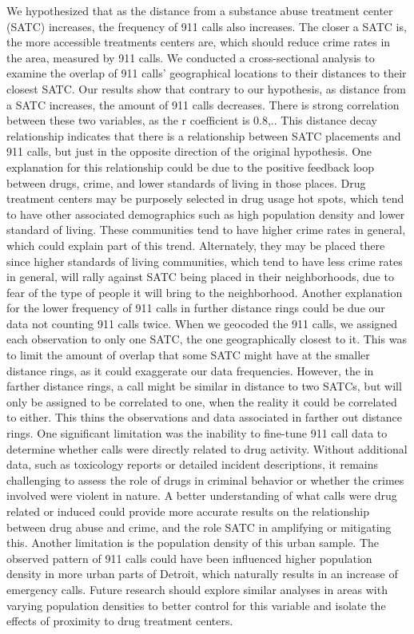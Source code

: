 \documentclass[12pt]{article}
\begin{document}
    We hypothesized that as the distance from a substance abuse treatment center (SATC) increases, the frequency of 911 calls also increases. The closer a SATC is, the more accessible treatments centers are, which should reduce crime rates in the area, measured by 911 calls. We conducted a cross-sectional analysis to examine the overlap of 911 calls' geographical locations to their distances to their closest SATC. Our results show that contrary to our hypothesis, as distance from a SATC increases, the amount of 911 calls decreases. There is strong correlation between these two variables, as the r coefficient is 0.8,.. This distance decay relationship indicates that there is a relationship between SATC placements and 911 calls, but just in the opposite direction of the original hypothesis. 
    One explanation for this relationship could be due to the positive feedback loop between drugs, crime, and lower standards of living in those places. Drug treatment centers may be purposely selected in drug usage hot spots, which tend to have other associated demographics such as high population density and lower standard of living. These communities tend to have higher crime rates in general, which could explain part of this trend. Alternately, they may be placed there since higher standards of living communities, which tend to have less crime rates in general, will rally against SATC being placed in their neighborhoods, due to fear of the type of people it will bring to the neighborhood. 
    Another explanation for the lower frequency of 911 calls in further distance rings could be due our data not counting 911 calls twice. When we geocoded the 911 calls, we assigned each observation to only one SATC, the one geographically closest to it. This was to limit the amount of overlap that some SATC might have at the smaller distance rings, as it could exaggerate our data frequencies. However, the in farther distance rings, a call might be similar in distance to two SATCs, but will only be assigned to be correlated to one, when the reality it could be correlated to either. This thins the observations and data associated in farther out distance rings. 
    One significant limitation was the inability to fine-tune 911 call data to determine whether calls were directly related to drug activity. Without additional data, such as toxicology reports or detailed incident descriptions, it remains challenging to assess the role of drugs in criminal behavior or whether the crimes involved were violent in nature. A better understanding of what calls were drug related or induced could provide more accurate results on the relationship between drug abuse and crime, and the role SATC in amplifying or mitigating this. 
    Another limitation is the population density of this urban sample. The observed pattern of 911 calls could have been influenced higher population density in more urban parts of Detroit, which naturally results in an increase of emergency calls. Future research should explore similar analyses in areas with varying population densities to better control for this variable and isolate the effects of proximity to drug treatment centers. 
\end{document}
